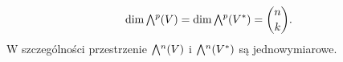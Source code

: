 \begin{equation*}
    \mathrm{dim}\,\Exterior^p(V) = \mathrm{dim}\,\Exterior^p(V^\ast) = \binom{n}{k}.
\end{equation*}
W szczególności przestrzenie \(\Exterior^n(V)\) i \(\Exterior^n(V^\ast)\) są jednowymiarowe. 

%

